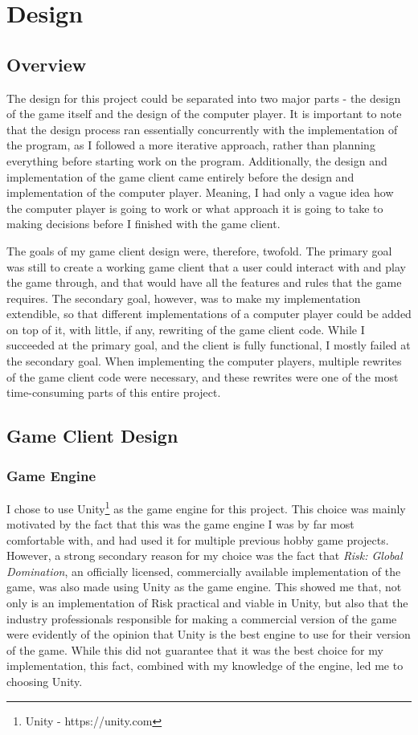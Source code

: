 \graphicspath{ {./Images/} }
\chapter{Design}
\section{Overview}
\label{overview}
The design for this project could be separated into two major parts - the design of the game itself and the design of the computer player. It is important to note that the design process ran essentially concurrently with the implementation of the program, as I followed a more iterative approach, rather than planning everything before starting work on the program. Additionally, the design and implementation of the game client came entirely before the design and implementation of the computer player. Meaning, I had only a vague idea how the computer player is going to work or what approach it is going to take to making decisions before I finished with the game client.

The goals of my game client design were, therefore, twofold. The primary goal was still to create a working game client that a user could interact with and play the game through, and that would have all the features and rules that the game requires. The secondary goal, however, was to make my implementation extendible, so that different implementations of a computer player could be added on top of it, with little, if any, rewriting of the game client code. While I succeeded at the primary goal, and the client is fully functional, I mostly failed at the secondary goal. When implementing the computer players, multiple rewrites of the game client code were necessary, and these rewrites were one of the most time-consuming parts of this entire project.

\section{Game Client Design}
\label{gameClientDesign}
\subsection{Game Engine}
\label{gameEngine}
I chose to use Unity\footnote{Unity - https://unity.com} as the game engine for this project. This choice was mainly motivated by the fact that this was the game engine I was by far most comfortable with, and had used it for multiple previous hobby game projects. However, a strong secondary reason for my choice was the fact that \textit{Risk: Global Domination}, an officially licensed, commercially available implementation of the game, was also made using Unity as the game engine. This showed me that, not only is an implementation of Risk practical and viable in Unity, but also that the industry professionals responsible for making a commercial version of the game were evidently of the opinion that Unity is the best engine to use for their version of the game. While this did not guarantee that it was the best choice for my implementation, this fact, combined with my knowledge of the engine, led me to choosing Unity.

